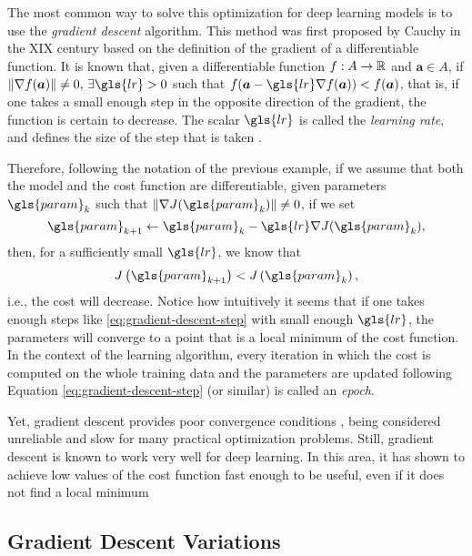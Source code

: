 The most common way to solve this optimization for deep learning models is to use the \textit{gradient descent} algorithm.
This method was first proposed by Cauchy in the XIX century \cite{lemarechal_cauchy_2012} based on the definition of the gradient of a differentiable function.
It is known that, given a differentiable function $f:A\to\mathbb{R}$ and $\bm{a} \in A$, if $\| \nabla f(\bm{a}) \| \neq 0,\,\exists \gls{lr} > 0$ such that $f(\bm{a} - \gls{lr} \nabla f(\bm{a})) < f(\bm{a})$, that is, if one takes a small enough step in the opposite direction of the gradient, the function is certain to decrease.
The scalar $\gls{lr}$ is called the \textit{learning rate}, and defines the size of the step that is taken \cite{goodfellow_deep_2016}.

Therefore, following the notation of the previous example, if we assume that both the model and the cost function are differentiable, given parameters $\gls{param}_k$ such that $\| \nabla J(\gls{param}_k) \| \neq 0$, if we set
\begin{equation}\label{eq:gradient-descent-step}
\gls{param}_{k+1} \gets \gls{param}_k - \gls{lr} \nabla J(\gls{param}_k) 
,\end{equation}
then, for a sufficiently small $\gls{lr}$, we know that \[
J\left( \gls{param}_{k+1} \right) < J\left( \gls{param}_k \right) 
,\] i.e., the cost will decrease.
Notice how intuitively it seems that if one takes enough steps like \eqref{eq:gradient-descent-step} with small enough $\gls{lr}$, the parameters will converge to a point that is a local minimum of the cost function.
In the context of the learning algorithm, every iteration in which the cost is computed on the whole training data and the parameters are updated following Equation \eqref{eq:gradient-descent-step} (or similar) is called an \emph{epoch}.


Yet, gradient descent provides poor convergence conditions \cite{wolfe_convergence_1969}, being considered unreliable and slow for many practical optimization problems.
Still, gradient descent is known to work very well for deep learning.
In this area, it has shown to achieve low values of the cost function fast enough to be useful, even if it does not find a local minimum \cite{goodfellow_deep_2016}

\subsection{Gradient Descent Variations}

